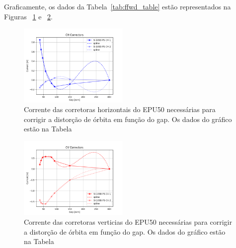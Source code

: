\documentclass[a4paper,
               keeplastbox,   %
               ]{jacow}
\begin{document}
Graficamente, os dados da Tabela~\ref{tab:ffwd_table} estão representados na Figuras ~\ref{fig:ffwd_table_h} e ~\ref{fig:ffwd_table_v}.
\begin{figure}[!htbp]
    \centering
    \includegraphics[width=0.47\textwidth]{idff_horizontal.png}
    \caption{Corrente das corretoras horizontais do EPU50 necessárias para corrigir a distorção de órbita em função do gap. Os dados do gráfico estão na Tabela}
    \label{fig:ffwd_table_h}
\end{figure}
\begin{figure}[!h]
    \centering
    \includegraphics[width=0.47\textwidth]{idff_vertical.png}
    \caption{Corrente das corretoras verticias do EPU50 necessárias para corrigir a distorção de órbita em função do gap. Os dados do gráfico estão na Tabela}
    \label{fig:ffwd_table_v}
\end{figure}
\end{document}
